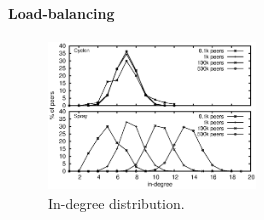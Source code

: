 \vspace{-7pt}
\paragraph{Load-balancing}

\begin{figure}
  \centering
  \includegraphics[width=0.49\textwidth]{img/histo.eps}
  \caption{\label{fig:histo}In-degree distribution.}
\end{figure}


